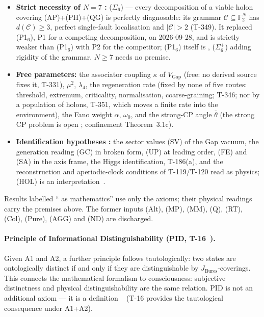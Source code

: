 \begin{itemize}[leftmargin=2em,nosep]
  \item \textbf{Strict necessity of $N = 7$ :} ($\Sigma_6$) --- every decomposition
        of a viable holon covering (AP)+(PH)+(QG) is perfectly diagnosable: its grammar
        $\mathcal C \subseteq \mathbb{F}_2^N$ has $d(\mathcal C) \geq 3$, perfect
        single-fault localisation and $\lvert\mathcal C\rvert > 2$ (T-349). It replaced
        (P1$_6$), P1 for a competing decomposition, on 2026-09-28, and is strictly weaker than
        (P1$_6$) with P2 for the competitor; (P1$_6$) itself is ,
        ($\Sigma_6^+$) adding rigidity of the grammar. $N \geq 7$ needs no premise.
  \item \textbf{Free parameters:} the associator coupling $\kappa$ of $V_{\mathrm{Gap}}$ (free:
        no derived source fixes it, T-331), $\mu^2$, $\lambda_4$, the regeneration rate (fixed by none of five routes:
        threshold, extremum, criticality, normalisation, coarse-graining; T-346; nor by a
        population of holons, T-351, which moves a finite rate into the environment), the
        Fano weight $\alpha$, $\omega_0$, and the strong-CP angle $\bar\theta$ (the strong CP
        problem is open ; confinement Theorem~3.1c).
  \item \textbf{Identification hypotheses :} the sector values (SV) of the Gap
        vacuum, the generation reading (GC) in broken form, (UP) at leading order,
        (FE) and (SA) in the axis frame, the Higgs identification, T-186(a), and the
        reconstruction and aperiodic-clock conditions of T-119/T-120 read as physics;
        (HOL) is an interpretation~.
\end{itemize}
Results labelled `` as mathematics'' use only the axioms; their physical
readings carry the premises above. The former inputs (Alt), (MP), (MM), (Q), (RT),
(Col), (Pure), (AGG) and (ND) are discharged.

\paragraph{Principle of Informational Distinguishability (PID, T-16~).}
Given A1 and A2, a further principle follows tautologically: two states are ontologically
distinct if and only if they are distinguishable by $J_{\mathrm{Bures}}$-coverings. This
connects the mathematical formalism to consciousness: subjective distinctness and physical
distinguishability are the same relation. PID is not an additional axiom --- it is a
definition ~ (T-16 provides the tautological consequence under A1+A2).

